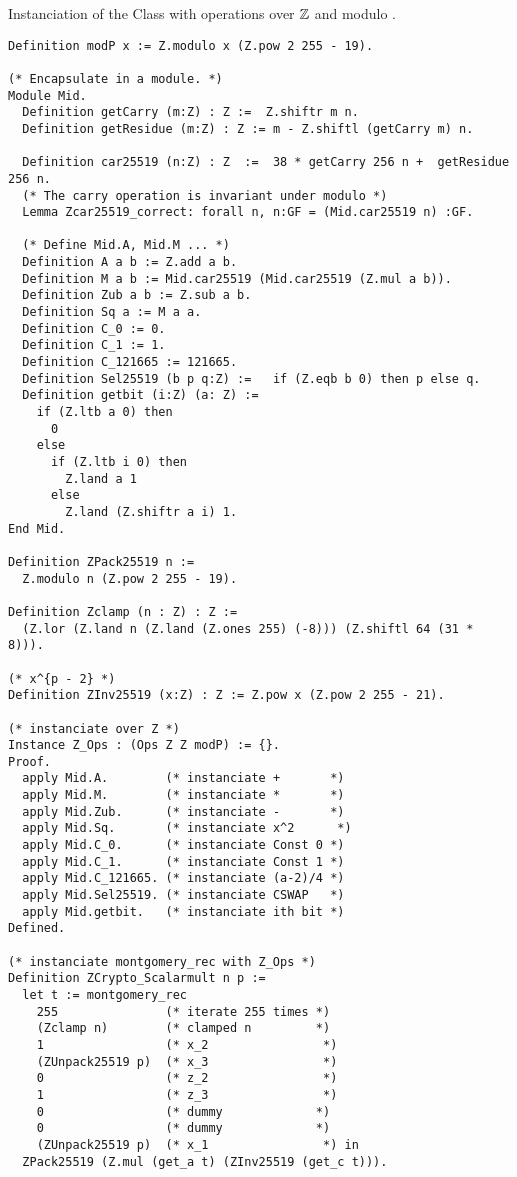 \documentclass{article}
\begin{document}
\newpage


Instanciation of the Class  with operations over $\mathbb{Z}$ and modulo \p.
\begin{lstlisting}[language=Coq]
Definition modP x := Z.modulo x (Z.pow 2 255 - 19).

(* Encapsulate in a module. *)
Module Mid.
  Definition getCarry (m:Z) : Z :=  Z.shiftr m n.
  Definition getResidue (m:Z) : Z := m - Z.shiftl (getCarry m) n.

  Definition car25519 (n:Z) : Z  :=  38 * getCarry 256 n +  getResidue 256 n.
  (* The carry operation is invariant under modulo *)
  Lemma Zcar25519_correct: forall n, n:GF = (Mid.car25519 n) :GF.

  (* Define Mid.A, Mid.M ... *)
  Definition A a b := Z.add a b.
  Definition M a b := Mid.car25519 (Mid.car25519 (Z.mul a b)).
  Definition Zub a b := Z.sub a b.
  Definition Sq a := M a a.
  Definition C_0 := 0.
  Definition C_1 := 1.
  Definition C_121665 := 121665.
  Definition Sel25519 (b p q:Z) :=   if (Z.eqb b 0) then p else q.
  Definition getbit (i:Z) (a: Z) :=
    if (Z.ltb a 0) then
      0
    else
      if (Z.ltb i 0) then
        Z.land a 1
      else
        Z.land (Z.shiftr a i) 1.
End Mid.

Definition ZPack25519 n :=
  Z.modulo n (Z.pow 2 255 - 19).

Definition Zclamp (n : Z) : Z :=
  (Z.lor (Z.land n (Z.land (Z.ones 255) (-8))) (Z.shiftl 64 (31 * 8))).

(* x^{p - 2} *)
Definition ZInv25519 (x:Z) : Z := Z.pow x (Z.pow 2 255 - 21).

(* instanciate over Z *)
Instance Z_Ops : (Ops Z Z modP) := {}.
Proof.
  apply Mid.A.        (* instanciate +       *)
  apply Mid.M.        (* instanciate *       *)
  apply Mid.Zub.      (* instanciate -       *)
  apply Mid.Sq.       (* instanciate x^2      *)
  apply Mid.C_0.      (* instanciate Const 0 *)
  apply Mid.C_1.      (* instanciate Const 1 *)
  apply Mid.C_121665. (* instanciate (a-2)/4 *)
  apply Mid.Sel25519. (* instanciate CSWAP   *)
  apply Mid.getbit.   (* instanciate ith bit *)
Defined.

(* instanciate montgomery_rec with Z_Ops *)
Definition ZCrypto_Scalarmult n p :=
  let t := montgomery_rec
    255               (* iterate 255 times *)
    (Zclamp n)        (* clamped n         *)
    1                 (* x_2                *)
    (ZUnpack25519 p)  (* x_3                *)
    0                 (* z_2                *)
    1                 (* z_3                *)
    0                 (* dummy             *)
    0                 (* dummy             *)
    (ZUnpack25519 p)  (* x_1                *) in
  ZPack25519 (Z.mul (get_a t) (ZInv25519 (get_c t))).
\end{lstlisting}
\end{document}
